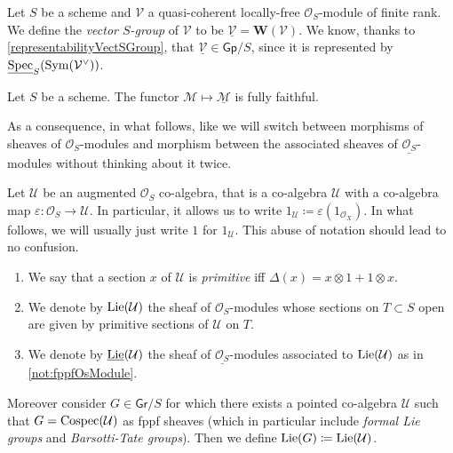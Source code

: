 \begin{defn}\label{defn:VectorSGroup}
	Let \(S\) be a scheme and \(\mathcal{V}\) a quasi-coherent
	locally-free \(\mathcal{O}_{ S }\)-module of finite rank.
	We define the \emph{vector \(S\)-group} of \(\mathcal{V}\)
	to be \(\underline{\mathcal{V}} = \mathbf{W}(\mathcal{V})\).
	We know, thanks to \cref{representabilityVectSGroup},
	that \(\underline{\mathcal{V}} \in \mathsf{Gp}/S\), since
	it is represented by \(\underline{\operatorname{Spec}}_S(\operatorname{Sym}(\mathcal{V}^\vee))\).
\end{defn}


\begin{prop}
	Let $S$ be a scheme. 
	The functor $\mathcal{M} \mapsto \underline{\mathcal{M}}$
	is fully faithful.
\end{prop}


\begin{rem}[]
	As a consequence, in what follows, like \cite[]{Messing} we will switch
	between morphisms of sheaves of $\mathcal{O}_{ S }$-modules and morphism
	between the associated sheaves of $\underline{\mathcal{O}_{ S }}$-modules
	without thinking about it twice.
\end{rem}


\begin{defn}
	Let $\mathcal{U}$ be an augmented \(\mathcal{O}_{ S }\) co-algebra,
	that is a co-algebra \(\mathcal{U}\) with a co-algebra
	map \(\varepsilon\colon \mathcal{O}_{ S } \to \mathcal{U}\).
	In particular, it allows us to write \(1_{ \mathcal{U} } \coloneqq
	\varepsilon(1_{ \mathcal{O}_{ X } })\).
	In what follows, we will usually just write \(1\) for
	\(1_{ \mathcal{U} }\). This abuse of notation
	should lead to no confusion.
\begin{enumerate}
\item We say that a section $x$ of $\mathcal{U}$ is \emph{primitive} iff
	$\Delta(x) = x \otimes 1 + 1 \otimes x$.

\item We denote by $\operatorname{Lie}(\mathcal{U})$ the sheaf of $\mathcal{O}_{ S }$-modules
	whose sections on $T \subset S$ open are given by
	primitive sections of $\mathcal{U}$ on $T$.

\item We denote by $\underline{\operatorname{Lie}}(\mathcal{U})$ 
	the sheaf of $\underline{\mathcal{O}_{ S }}$-modules
	associated to $\operatorname{Lie}(\mathcal{U})$ as in \cref{not:fppfOsModule}.
\end{enumerate}
	Moreover consider $G \in \mathsf{Gr}/S$ for which there exists a
	pointed co-algebra $\mathcal{U}$ such that $G = \operatorname{Cospec}(\mathcal{U})$ as
	fppf sheaves (which in particular include \emph{formal Lie groups} and \emph{Barsotti-Tate groups}).
	Then we define $\operatorname{Lie}(G) \coloneqq \operatorname{Lie}(\mathcal{U})$.
\end{defn}



